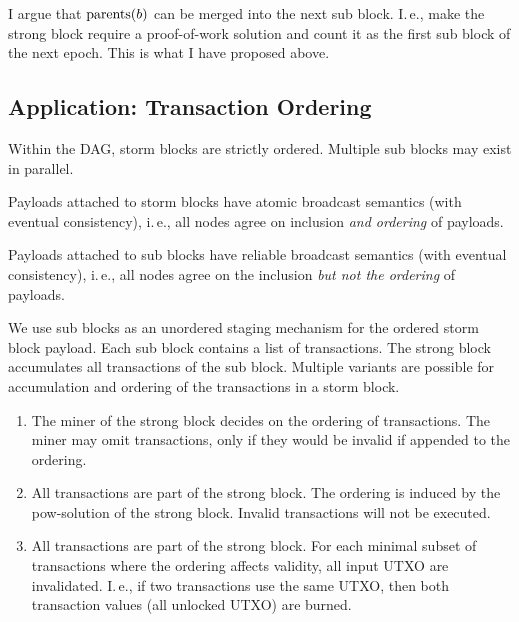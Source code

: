 I argue that $\operatorname{parents}(b)$ can be merged into the next sub block.
I.\,e., make the strong block require a proof-of-work solution and count it as the first sub block of the next epoch.
This is what I have proposed above.

\subsection{Application: Transaction Ordering}

Within the DAG, storm blocks are strictly ordered. Multiple sub blocks may exist in parallel.

Payloads attached to storm blocks have atomic broadcast semantics (with eventual consistency), i.\,e., all nodes agree on inclusion \emph{and ordering} of payloads.

Payloads attached to sub blocks have reliable broadcast semantics (with eventual consistency), i.\,e., all nodes agree on the inclusion \emph{but not the ordering} of payloads.

We use sub blocks as an unordered staging mechanism for the ordered storm block payload.
Each sub block contains a list of transactions.
The strong block accumulates all transactions of the sub block.
Multiple variants are possible for accumulation and ordering of the transactions in a storm block.

\begin{enumerate}
  \item The miner of the strong block decides on the ordering of transactions.
    The miner may omit transactions, only if they would be invalid if appended to the ordering.
  \item All transactions are part of the strong block.
    The ordering is induced by the pow-solution of the strong block.
    Invalid transactions will not be executed.
  \item All transactions are part of the strong block.
    For each minimal subset of transactions where the ordering affects validity, all input UTXO are invalidated.
    I.\,e., if two transactions use the same UTXO, then both transaction values (all unlocked UTXO) are burned.
\end{enumerate}

\egroup %
